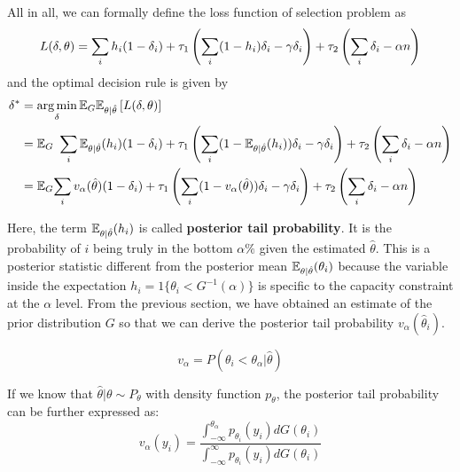 \documentclass[12pt]{article}
\begin{document}
All in all, we can formally define the loss function of selection problem as
\begin{equation*}
    L(\delta,\theta)=\sum_i h_i(1-\delta_i) +\tau_1\left(\sum_i (1-h_i)\delta_i -\gamma \delta_i\right) + \tau_2 \left(\sum_i \delta_i -\alpha n\right)
\end{equation*}
and the optimal decision rule is given by
\begin{equation} \label{eq:decisionrule}
    \begin{split}
        \delta^* & =\operatorname*{arg\,min}_\delta \mathbb{E}_G\mathbb{E}_{\theta|\hat{\theta}}\left[L(\delta,\theta)\right]                                                                                                              \\
        & = \mathbb{E}_G \ \sum_i \mathbb{E}_{\theta|\hat{\theta}}(h_i)(1-\delta_i) +\tau_1\left(\sum_i (1-\mathbb{E}_{\theta|\hat{\theta}}(h_i))\delta_i -\gamma \delta_i\right) + \tau_2 \left(\sum_i \delta_i -\alpha n\right) \\
        & =\mathbb{E}_G{\sum_i v_\alpha(\hat{\theta})(1-\delta_i) +\tau_1\left(\sum_i (1-v_\alpha(\hat{\theta}))\delta_i -\gamma \delta_i\right) + \tau_2 \left(\sum_i \delta_i -\alpha n\right)}
    \end{split}
\end{equation}

Here, the term \(\mathbb{E}_{\theta|\hat{\theta}}(h_i)\) is called \textbf{posterior
    tail probability}. It is the probability of \(i\) being truly in the bottom
\(\alpha\%\) given the estimated \(\hat{\theta}\). This is a posterior
statistic different from the posterior mean
\(\mathbb{E}_{\theta|\hat{\theta}}(\theta_i)\) because the variable inside the
expectation \(h_i = 1\{\theta_i < G^{-1}(\alpha)\}\) is specific to the
capacity constraint at the \(\alpha\) level. From the previous section, we have
obtained an estimate of the prior distribution \(G\) so that we can derive the
posterior tail probability \(v_\alpha(\hat{\theta}_i)\).

\begin{equation*}
    v_\alpha=P( \theta_i < \theta_{\alpha} |\hat{\theta})
\end{equation*}

If we know that \(\hat{\theta}|\theta \sim P_\theta\) with density function
\(p_\theta\), the posterior tail probability can be further expressed as:
\begin{equation*}
    v_\alpha(y_i) = \frac{\int_{-\infty}^{\theta_{\alpha}} p_{\theta_i}(y_i) dG(\theta_i)}
    {\int_{-\infty}^{\infty} p_{\theta_i}(y_i) dG(\theta_i)}
\end{equation*}
\end{document}

